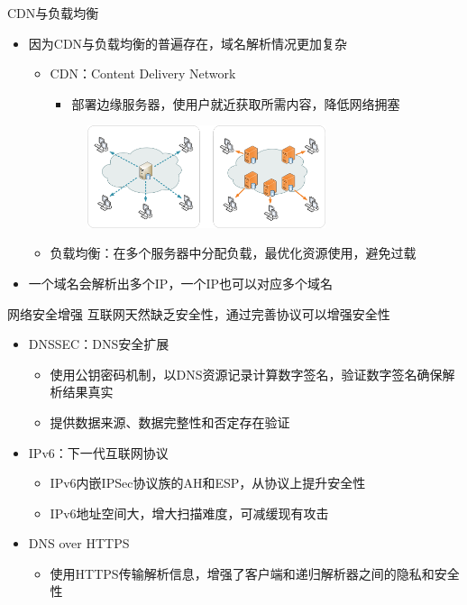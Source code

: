 \documentclass{beamer}
\begin{document}
\begin{frame}{CDN与负载均衡}
  \begin{itemize}
    \item 因为CDN与负载均衡的普遍存在，域名解析情况更加复杂
    \begin{itemize}
    \item CDN：Content Delivery Network
    \begin{itemize}
      \item 部署边缘服务器，使用户就近获取所需内容，降低网络拥塞
    \end{itemize}
    \begin{figure}
    \includegraphics[height=3cm,width=7.07cm]{images/NCDNCDN.png}
    \end{figure}
    
    \item 负载均衡：在多个服务器中分配负载，最优化资源使用，避免过载
    \end{itemize}
    \item 一个域名会解析出多个IP，一个IP也可以对应多个域名
  \end{itemize}

\end{frame}
\begin{frame}{网络安全增强}
  互联网天然缺乏安全性，通过完善协议可以增强安全性
  \begin{itemize}
    \item DNSSEC：DNS安全扩展
    \begin{itemize}
      \item 使用公钥密码机制，以DNS资源记录计算数字签名，验证数字签名确保解析结果真实
      \item 提供数据来源、数据完整性和否定存在验证
    \end{itemize}
    \item IPv6：下一代互联网协议
    \begin{itemize}
      \item IPv6内嵌IPSec协议族的AH和ESP，从协议上提升安全性
      \item IPv6地址空间大，增大扫描难度，可减缓现有攻击
    \end{itemize}
    \item DNS over HTTPS
    \begin{itemize}
      \item 使用HTTPS传输解析信息，增强了客户端和递归解析器之间的隐私和安全性
    \end{itemize}
  \end{itemize}  
\end{frame}
\end{document}

